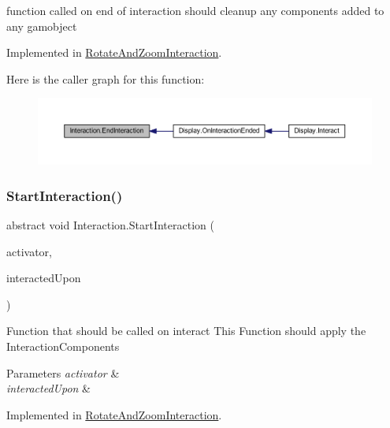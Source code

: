 function called on end of interaction should cleanup any components added to any gamobject 



Implemented in \mbox{\hyperlink{class_rotate_and_zoom_interaction_af0c13721da9fee4e1f7ce226d4cf7bea}{Rotate\+And\+Zoom\+Interaction}}.

Here is the caller graph for this function\+:\nopagebreak
\begin{figure}[H]
\begin{center}
\leavevmode
\includegraphics[width=350pt]{class_interaction_a13c7d99dbecf8e0d61973fd23de6400c_icgraph}
\end{center}
\end{figure}
\mbox{\label{class_interaction_afa5031e1db8f7c23cf26c896937e69f9}} 
\subsubsection{\texorpdfstring{Start\+Interaction()}{StartInteraction()}}
{\footnotesize\ttfamily abstract void Interaction.\+Start\+Interaction (\begin{DoxyParamCaption}\item[{Game\+Object}]{activator,  }\item[{Game\+Object}]{interacted\+Upon }\end{DoxyParamCaption})\hspace{0.3cm}{\ttfamily [pure virtual]}}



Function that should be called on interact This Function should apply the Interaction\+Components 


\begin{DoxyParams}{Parameters}
{\em activator} & \\
\hline
{\em interacted\+Upon} & \\
\hline
\end{DoxyParams}


Implemented in \mbox{\hyperlink{class_rotate_and_zoom_interaction_ad92e1c40e9cbb2fb3dcf234e72d0e595}{Rotate\+And\+Zoom\+Interaction}}.

